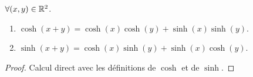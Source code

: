 \begin{proposition}
	$\forall (x, y) \in \mathbb{R}^2$.
    \begin{enumerate}
        \item $\cosh(x + y) = \cosh(x) \cosh(y) + \sinh(x) \sinh(y)$.
        \item $\sinh(x + y) = \cosh(x) \sinh(y) + \sinh(x) \cosh(y)$.
    \end{enumerate}
\end{proposition}

\begin{proof}
    Calcul direct avec les définitions de $\cosh$ et de $\sinh$.
\end{proof}
